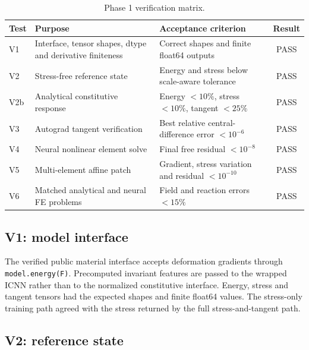 \documentclass[11pt,a4paper]{article}
\begin{document}
\begin{table}[H]
  \centering
  \small
  \caption{Phase 1 verification matrix.}
  \label{tab:verification}
  \begin{tabular}{p{}p{}p{}c}
    \toprule
    Test & Purpose & Acceptance criterion & Result\\
    \midrule
    V1 & Interface, tensor shapes, dtype and derivative finiteness
       & Correct shapes and finite float64 outputs & PASS\\
    V2 & Stress-free reference state
       & Energy and stress below scale-aware tolerance & PASS\\
    V2b & Analytical constitutive response
       & Energy $<10\%$, stress $<10\%$, tangent $<25\%$ & PASS\\
    V3 & Autograd tangent verification
       & Best relative central-difference error $<10^{-6}$ & PASS\\
    V4 & Neural nonlinear element solve
       & Final free residual $<10^{-8}$ & PASS\\
    V5 & Multi-element affine patch
       & Gradient, stress variation and residual $<10^{-10}$ & PASS\\
    V6 & Matched analytical and neural FE problems
       & Field and reaction errors $<15\%$ & PASS\\
    \bottomrule
  \end{tabular}
\end{table}

\subsection{V1: model interface}

The verified public material interface accepts deformation gradients through
\texttt{model.energy(F)}. Precomputed invariant features are passed to the
wrapped ICNN rather than to the normalized constitutive interface. Energy,
stress and tangent tensors had the expected shapes and finite float64 values.
The stress-only training path agreed with the stress returned by the full
stress-and-tangent path.

\subsection{V2: reference state}
\end{document}

